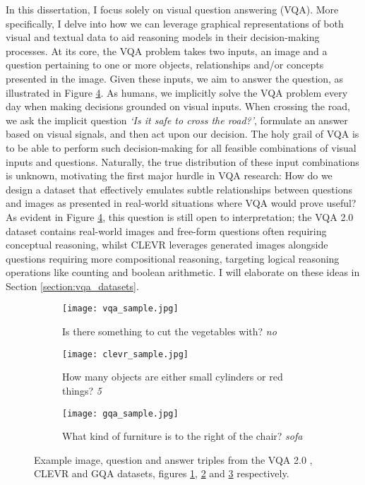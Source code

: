 In this dissertation, I focus solely on visual question answering (VQA). More specifically, I delve into how we can leverage graphical representations of both visual and textual data to aid reasoning models in their decision-making processes. At its core, the VQA problem takes two inputs, an image and a question pertaining to one or more objects, relationships and/or concepts presented in the image. Given these inputs, we aim to answer the question, as illustrated in Figure \ref{fig:dataset_samples}. As humans, we implicitly solve the VQA problem every day when making decisions grounded on visual inputs. When crossing the road, we ask the implicit question \textit{`Is it safe to cross the road?'}, formulate an answer based on visual signals, and then act upon our decision. The holy grail of VQA is to be able to perform such decision-making for all feasible combinations of visual inputs and questions. Naturally, the true distribution of these input combinations is unknown, motivating the first major hurdle in VQA research: How do we design a dataset that effectively emulates subtle relationships between questions and images as presented in real-world situations where VQA would prove useful? As evident in Figure \ref{fig:dataset_samples}, this question is still open to interpretation; the VQA 2.0 dataset contains real-world images and free-form questions often requiring conceptual reasoning, whilst CLEVR leverages generated images alongside questions requiring more compositional reasoning, targeting logical reasoning operations like counting and boolean arithmetic. I will elaborate on these ideas in Section \ref{section:vqa_datasets}.

\begin{figure}
  \begin{subfigure}[t]{0.3\textwidth}
    \centering
    \texttt{[image: vqa\_sample.jpg]} 
    \caption{Is there something to cut the vegetables with? \textit{no}}
    \label{fig:vqa_sample}
  \end{subfigure}
  \hfill
  \begin{subfigure}[t]{0.3\textwidth}
    \centering
    \texttt{[image: clevr\_sample.jpg]} 
    \caption{How many objects are either small cylinders or red things? \textit{5}}
    \label{fig:clevr_sample}
  \end{subfigure}
  \hfill
  \begin{subfigure}[t]{0.3\textwidth}
    \centering
    \texttt{[image: gqa\_sample.jpg]} 
    \caption{What kind of furniture is to the right of the chair? \textit{sofa}}
    \label{fig:gqa_sample}
  \end{subfigure}
  \caption[Example instances from the VQA 2.0, CLEVR and GQA datasets.]{Example image, question and answer triples from the VQA 2.0 \cite{goyal2017making}, CLEVR \cite{johnson2017clevr} and GQA \cite{hudson2019gqa} datasets, figures \ref{fig:vqa_sample}, \ref{fig:clevr_sample} and \ref{fig:gqa_sample} respectively.}
  \label{fig:dataset_samples}
\end{figure}

